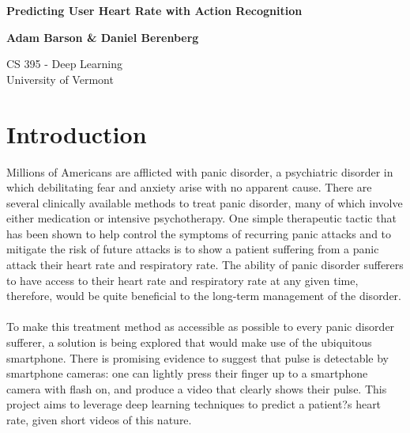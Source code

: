 \documentclass{article}
\begin{document}
\begin{titlepage}
    \begin{center}
        \vspace*{8cm}
        
        {\Large\textbf{Predicting User Heart Rate with Action Recognition}}
        
        \vspace{0.5cm}
        
        \textbf{Adam Barson \& Daniel Berenberg}
        
        \vspace{0.5cm}
        CS 395 - Deep Learning \\
        University of Vermont \\
        
    \end{center}
\end{titlepage}

\section*{Introduction}{Millions of Americans are afflicted with panic disorder, a psychiatric disorder in which debilitating fear and anxiety arise with no apparent cause. There are several clinically available methods to treat panic disorder, many of which involve either medication or intensive psychotherapy. One simple therapeutic tactic that has been shown to help control the symptoms of recurring panic attacks and to mitigate the risk of future attacks is to show a patient suffering from a panic attack their heart rate and respiratory rate. The ability of panic disorder sufferers to have access to their heart rate and respiratory rate at any given time, therefore, would be quite beneficial to the long-term management of the disorder.  \\ \\
\noindent To make this treatment method as accessible as possible to every panic disorder sufferer, a solution is being explored that would make use of the ubiquitous smartphone. There is promising evidence to suggest that pulse is detectable by smartphone cameras: one can lightly press their finger up to a smartphone camera with flash on, and produce a video that clearly shows their pulse. This project aims to leverage deep learning techniques to predict a patient?s heart rate, given short videos of this nature.}
\end{document}
